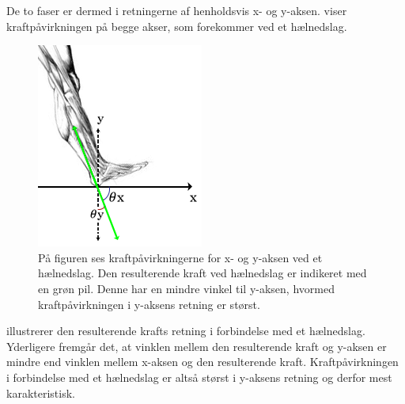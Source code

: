 De to faser er dermed i retningerne af henholdsvis x- og y-aksen.  viser kraftpåvirkningen på begge akser, som forekommer ved et hælnedslag.  
\begin{figure}[H]
	\centering
	\includegraphics[scale=0.7]{figures/bProblemloesning/kraefter_akser.png}
	\caption{På figuren ses kraftpåvirkningerne for x- og y-aksen ved et hælnedslag. Den resulterende kraft ved hælnedslag er indikeret med en grøn pil. Denne har en mindre vinkel til y-aksen, hvormed kraftpåvirkningen i y-aksens retning er størst.}
	\label{fig:kraefter_akser}
\end{figure}\vspace{-0.25cm} 
 illustrerer den resulterende krafts retning i forbindelse med et hælnedslag. Yderligere fremgår det, at vinklen mellem den resulterende kraft og y-aksen er mindre end vinklen mellem x-aksen og den resulterende kraft. Kraftpåvirkningen i forbindelse med et hælnedslag er altså størst i y-aksens retning og derfor mest karakteristisk.~\citep{Rueterbories2010,Serway2010,ClelandKikhia2013}

